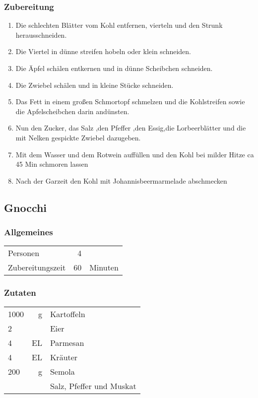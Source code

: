 \subsubsection*{Zubereitung}
\begin{enumerate}
    \item Die schlechten Blätter vom Kohl entfernen, vierteln und den Strunk herausschneiden.
    \item Die Viertel in dünne streifen hobeln oder klein schneiden.
    \item Die Äpfel schälen entkernen und in dünne Scheibchen schneiden.
    \item Die Zwiebel schälen und in kleine Stücke schneiden.
    \item Das Fett in einem großen Schmortopf schmelzen und die Kohlstreifen sowie die Apfelscheibchen darin andünsten.
    \item Nun den Zucker, das Salz ,den Pfeffer ,den Essig,die Lorbeerblätter und die mit Nelken gespickte Zwiebel dazugeben.
    \item Mit dem Wasser und dem Rotwein auffüllen und den Kohl bei milder Hitze ca 45 Min schmoren lassen
    \item Nach der Garzeit den Kohl mit Johannisbeermarmelade abschmecken
    
\end{enumerate}



\subsection{Gnocchi}\label{sec:Gnocchi}

\subsubsection*{Allgemeines}
\begin{tabular}{lrl}
    Personen         &  4  &  \\
    Zubereitungszeit &  60 & Minuten \\
\end{tabular} 

\subsubsection*{Zutaten}
\begin{tabular}{lrl}
    1000 &  g &  Kartoffeln \\
    2   &    & Eier               \\
    4   & EL & Parmesan           \\
    4   & EL & Kräuter            \\
    200 &  g & Semola               \\
    &    & Salz, Pfeffer und Muskat
\end{tabular} 


